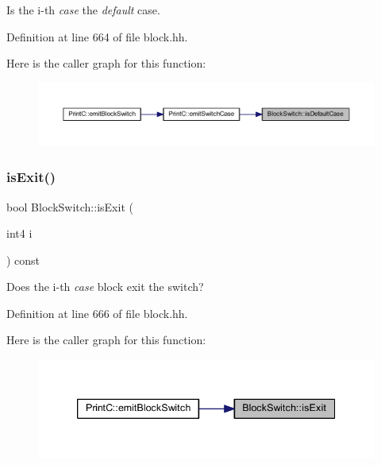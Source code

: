 Is the i-\/th {\itshape case} the {\itshape default} case. 



Definition at line 664 of file block.\+hh.

Here is the caller graph for this function\+:
\nopagebreak
\begin{figure}[H]
\begin{center}
\leavevmode
\includegraphics[width=350pt]{class_block_switch_a952906ee6ff751cb66e365e0e78f165c_icgraph}
\end{center}
\end{figure}
\mbox{\label{class_block_switch_a3e6d878a6e1aeb2ca7278415adfc48db}} 
\subsubsection{\texorpdfstring{isExit()}{isExit()}}
{\footnotesize\ttfamily bool Block\+Switch\+::is\+Exit (\begin{DoxyParamCaption}\item[{int4}]{i }\end{DoxyParamCaption}) const\hspace{0.3cm}{\ttfamily [inline]}}



Does the i-\/th {\itshape case} block exit the switch? 



Definition at line 666 of file block.\+hh.

Here is the caller graph for this function\+:
\nopagebreak
\begin{figure}[H]
\begin{center}
\leavevmode
\includegraphics[width=339pt]{class_block_switch_a3e6d878a6e1aeb2ca7278415adfc48db_icgraph}
\end{center}
\end{figure}
\mbox{\label{class_block_switch_ac0f9b63b617ff225b3240f8dda6cf56b}} 
